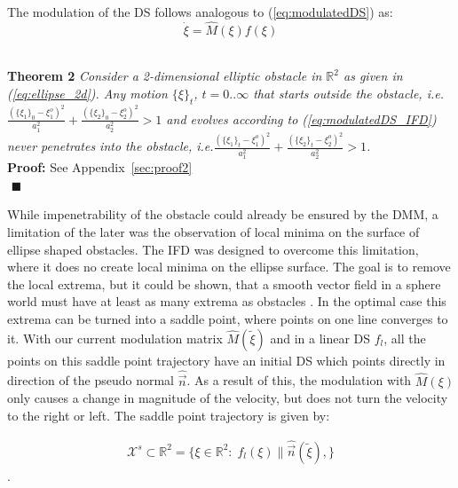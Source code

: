 The modulation of the DS follows analogous to (\ref{eq:modulatedDS}) as:
\begin{equation}
  \dot \xi = \hat{M}(\xi) f(\xi) \label{eq:modulatedDS_IFD}
\end{equation}

\\ \noindent\textbf{Theorem 2}
\textit{Consider a 2-dimensional elliptic obstacle in $\mathbb{R}^2$ as given in (\ref{eq:ellipse_2d}). Any motion $\{\xi\}_t$, $t = 0 .. \infty$ that starts outside the obstacle, i.e. $ \frac{(\{\xi_1\}_0 - \xi_1^o)^2}{a_1^2} + \frac{(\{\xi_2\}_0 - \xi_2^o)^2}{a_2^2} > 1  $ and evolves according to (\ref{eq:modulatedDS_IFD}) never penetrates into the obstacle, i.e.$ \frac{(\{\xi_1\}_t - \xi_1^o)^2}{a_1^2} + \frac{(\{\xi_2\}_t - \xi_2^o)^2}{a_2^2} > 1 $.} \\
\textbf{Proof:} See Appendix~\ref{sec:proof2} \\
${}$ \hfill $\blacksquare$


While impenetrability of the obstacle could already be ensured by the DMM, a limitation of the later was the observation of local minima on the surface of ellipse shaped obstacles. The IFD was designed to overcome this limitation, where it does no create local minima on the ellipse surface. The goal is to remove the local extrema, but it could be shown, that a smooth vector field in a sphere world must have at least as many extrema as obstacles \cite{koditschek1990robot}. In the optimal case this extrema can be turned into a saddle point, where points on one line converges to it. With our current modulation matrix $\hat M(\tilde \xi)$ and in a linear DS $f_l$, all the points on this saddle point trajectory have an initial DS which points directly in direction of the pseudo normal $\hat{\vec n}$. As a result of this, the modulation with $\hat M(\xi)$ only causes a change in magnitude of the velocity, but does not turn the velocity to the right or left. The saddle point trajectory is given by:

\begin{equation}
  \begin{split}
  \mathcal{X}^s \subset \mathbb{R}^2 = \{\xi \in \mathbb{R}^2: \; f_l(\xi) \parallel \hat{\vec n}(\tilde \xi), \} \label{eq:centerLine}
  \end{split}
\end{equation}.\\

